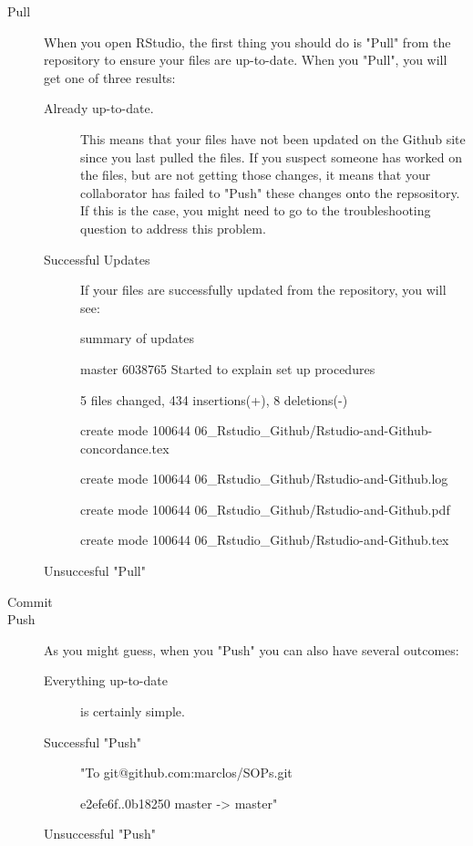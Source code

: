 \documentclass{article}
\begin{document}
\begin{description}
  \item[Pull] When you open RStudio, the first thing you should do is "Pull" from the repository to ensure your files are up-to-date. When you "Pull", you will get one of three results:
  
  \begin{description}
  \item[Already up-to-date.] This means that your files have not been updated on the Github site since you last pulled the files. If you suspect someone has worked on the files, but are not getting those changes, it means that your collaborator has failed to "Push" these changes onto the repsository. If this is the case, you might need to go to the troubleshooting question to address this problem.
  \item[Successful Updates] If your files are successfully updated from the repository, you will see:
  
summary of updates

master 6038765 Started to explain set up procedures
 
 5 files changed, 434 insertions(+), 8 deletions(-)
 
 create mode 100644 06\_Rstudio\_Github/Rstudio-and-Github-concordance.tex
 
 create mode 100644 06\_Rstudio\_Github/Rstudio-and-Github.log
 
 create mode 100644 06\_Rstudio\_Github/Rstudio-and-Github.pdf
 
 create mode 100644 06\_Rstudio\_Github/Rstudio-and-Github.tex
 
 \item[Unsuccesful "Pull"]
 
 
\end{description}

  \item[Commit]
  \item[Push] As you might guess, when you "Push" you can also have several outcomes:
\begin{description}
  \item[Everything up-to-date] is certainly simple.   \item[Successful "Push"]
  
    "To git@github.com:marclos/SOPs.git
  
   e2efe6f..0b18250  master -> master"
   \item[Unsuccessful "Push"]
\end{description}
  
  
  

   
\end{description}
\end{document}
